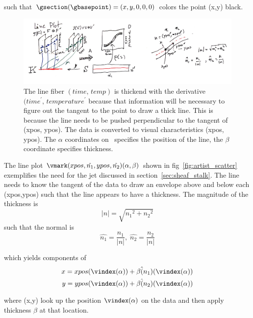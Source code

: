 \documentclass[../main.tex]{subfiles}
\begin{document}
such that $\gsection(\gbasepoint) = (x, y, 0, 0, 0)$ colors the point (x,y) black.

\label{sec:artist_example_line}
\begin{figure}[H]
    \includegraphics[width=\textwidth]{figures/math/line.png}
    \caption{The line fiber $(time,\, temp)$ is thickend with the derivative $(time^{\prime},\, temperature^{\prime}$ because that information will be necessary to figure out the tangent to the point to draw a thick line. This is because the line needs to be pushed perpendicular to the tangent of (xpos, ypos).  The data is converted to visual characteristics (xpos, ypos). The $\alpha$ coordinates on \gbase\ specifies the position of the line, the $\beta$ coordinate specifies thickness.}
    \label{fig:artist_line}
\end{figure}

The line plot $\vmark(xpos, \hat{n_{1}}, ypos, \hat{n_{2}})(\alpha, \beta)$ shown in fig~\ref{fig:artist_scatter} exemplifies the need for the jet discussed in section~\ref{sec:sheaf_stalk}. The line needs to know the tangent of the data to draw an envelope above and below each (xpos,ypos) such that the line appears to have a thickness. The magnitude of the thickness is 
\begin{equation}
    \lvert n \rvert = \sqrt{{n_{1}}^2 + {n_{2}}^2}
\end{equation}
such that the normal is  
\begin{equation}
    \hat{n_{1}} = \frac{n_1}{\lvert n \rvert}, \; \hat{n_{2}} = \frac{n_2}{\lvert n \rvert}
\end{equation}

which yields components of \gsection
\begin{align}
 x = xpos(\vindex(\alpha)) &+ \beta\hat(n_1)(\vindex(\alpha)) \\
 y = ypos(\vindex(\alpha)) &+ \beta\hat(n_2)(\vindex(\alpha)) 
\end{align}

where (x,y) look up the position $\vindex(\alpha)$ on the data and then apply thickness $\beta$ at that location. 
\end{document}
